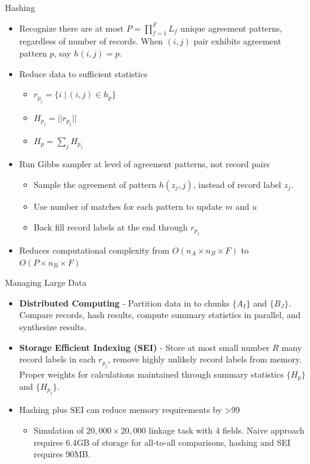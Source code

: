 \documentclass{beamer}
\begin{document}
\begin{frame}{Hashing}
	\begin{itemize}
		\item Recognize there are at most $P = \prod_{f = 1}^F L_f$ unique agreement patterns, regardless of number of records. When $(i,j)$ pair exhibits agreement pattern $p$, say $h(i, j)=p.$
		
		\item Reduce data to sufficient statistics
		\begin{itemize}
		\item $r_{p_j} = \{i \;|\, (i, j) \in h_p\}$
		\item $H_{p_j} = ||r_{p_j}||$
		\item $H_p = \sum_{j} H_{p_j}$
		\end{itemize}
		
		\item Run Gibbs sampler at level of agreement patterns, not record pairs
		\begin{itemize}
		\item Sample the agreement of pattern $h(z_j, j)$, instead of record label $z_j$.
		\item Use number of matches for each pattern to update $m$ and $u$
		\item Back fill record labels at the end through $r_{p_j}$
	\end{itemize}

		\item Reduces computational complexity from $O(n_A \times n_B \times F)$ to $O(P \times n_B \times F)$
	\end{itemize}
\end{frame}

\begin{frame}{Managing Large Data}
	\begin{itemize}
		\item \textbf{Distributed Computing} - Partition data in to chunks $\{A_I\}$ and $\{B_J\}$. Compare records, hash results, compute summary statistics in parallel, and synthesize results.
		
		\item \textbf{Storage Efficient Indexing (SEI)} - Store at most small number $R$ many record labels in each $r_{p_j}$, remove highly unlikely record labels from memory. Proper weights for calculations maintained through summary statistics $\{H_p\}$ and $\{H_{p_j}\}$.
		
		\item Hashing plus SEI can reduce memory requirements by >99%
		\begin{itemize}
			\item Simulation of $20,000 \times 20,000$ linkage task with 4 fields. Naive approach requires 6.4GB of storage for all-to-all comparisons, hashing and SEI requires 90MB.
		\end{itemize}
	\end{itemize}
\end{frame}
\end{document}
